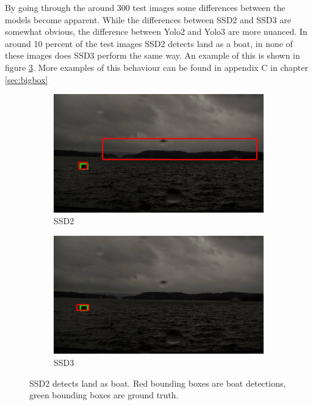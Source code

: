\vspace{3mm}

By going through the around 300 test images some differences between the models become apparent. While the differences between SSD2 and SSD3 are somewhat obvious, the difference between Yolo2 and Yolo3 are more nuanced. In around 10 percent of the test images SSD2 detects land as a boat, in none of these images does SSD3 perform the same way. An example of this is shown in figure \ref{img:bixbox_ssd}. More examples of this behaviour can be found in appendix C in chapter \ref{sec:bigbox}

\begin{figure}[h!]
\begin{subfigure}{.5\textwidth}
  \centering
  \includegraphics[width=0.9\linewidth]{results/case_buildings/bigbox_bcbf/SSD2/selected_06_14_axis0049.jpg}
  \caption{SSD2}
  \label{fig:big_box_ssd2}
\end{subfigure}%
\begin{subfigure}{.5\textwidth}
  \centering
  \includegraphics[width=.9\linewidth]{results/case_buildings/bigbox_bcbf/SSD3/selected_06_14_axis0049.jpg}
  \caption{SSD3}
  \label{fig:big_box_ssd3}
\end{subfigure}
\caption{SSD2 detects land as boat. Red bounding boxes are boat detections, green bounding boxes are ground truth.}
\label{img:bixbox_ssd}
\end{figure}

